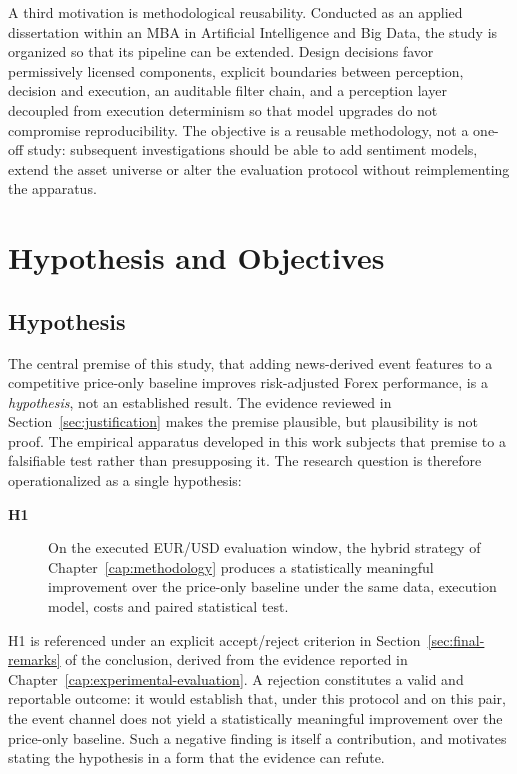 A third motivation is methodological reusability. Conducted as an applied dissertation within an MBA in Artificial Intelligence and Big Data, the study is organized so that its pipeline can be extended. Design decisions favor permissively licensed components, explicit boundaries between perception, decision and execution, an auditable filter chain, and a perception layer decoupled from execution determinism so that model upgrades do not compromise reproducibility. The objective is a reusable methodology, not a one-off study: subsequent investigations should be able to add sentiment models, extend the asset universe or alter the evaluation protocol without reimplementing the apparatus.

\section{Hypothesis and Objectives} \label{sec:objectives}

\subsection{Hypothesis} \label{sec:hypothesis}
The central premise of this study, that adding news-derived event features to a competitive price-only baseline improves risk-adjusted Forex performance, is a \textit{hypothesis}, not an established result. The evidence reviewed in Section~\ref{sec:justification} makes the premise plausible, but plausibility is not proof. The empirical apparatus developed in this work subjects that premise to a falsifiable test rather than presupposing it. The research question is therefore operationalized as a single hypothesis:
\begin{description}
  \item[\textbf{H1}] On the executed EUR/USD evaluation window, the hybrid
  strategy of Chapter~\ref{cap:methodology} produces a statistically meaningful
  improvement over the price-only baseline under the same data, execution model,
  costs and paired statistical test.
\end{description}
H1 is referenced under an explicit accept/reject criterion in
Section~\ref{sec:final-remarks} of the conclusion, derived from the evidence
reported in Chapter~\ref{cap:experimental-evaluation}. A rejection constitutes
a valid and reportable outcome: it would establish that, under this protocol
and on this pair, the event channel does not yield a statistically
meaningful improvement over the price-only baseline. Such a negative finding
is itself a contribution, and motivates stating the hypothesis in a form that
the evidence can refute.

